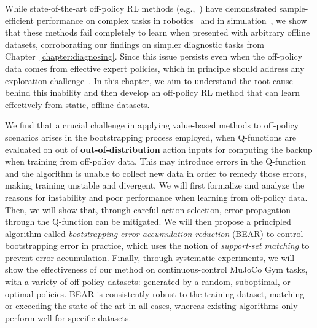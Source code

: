 While state-of-the-art off-policy RL methods (e.g.,~\citep{haarnoja2018sac,munos2016safe,kalashnikov2018qt,impala2018}) have demonstrated sample-efficient performance on complex tasks in robotics~\cite{kalashnikov2018qt} and in simulation~\cite{mujoco}, we show that these methods fail completely to learn when presented with arbitrary offline datasets, corroborating our findings on simpler diagnostic tasks from Chapter~\ref{chapter:diagnosing}. Since this issue persists even when the off-policy data comes from effective expert policies, which in principle should address any exploration challenge~\citep{deBruin2015importance,fujimoto2018off,fu2019diagnosing}. In this chapter, we aim to understand the root cause behind this inability and then develop an off-policy RL method that can learn effectively from static, offline datasets. 

We find that a crucial challenge in applying value-based methods to off-policy scenarios arises in the bootstrapping process employed, when Q-functions are evaluated on out of \textbf{out-of-distribution} action inputs for computing the backup when training from off-policy data. This may introduce errors in the Q-function and the algorithm is unable to collect new data in order to remedy those errors, making training unstable and divergent. We will first formalize and analyze the reasons for instability and poor performance when learning from off-policy data. Then, we will show that, through careful action selection, error propagation through the Q-function can be mitigated. We will then propose a principled algorithm called \emph{bootstrapping error accumulation reduction} (BEAR) to control bootstrapping error in practice, which uses the notion of \emph{support-set matching} to prevent error accumulation. Finally, through systematic experiments, we will show the effectiveness of our method on continuous-control MuJoCo Gym tasks, with a variety of off-policy datasets: generated by a random, suboptimal, or optimal policies. BEAR is consistently robust to the training dataset, matching or exceeding the state-of-the-art in all cases, whereas existing algorithms only perform well for specific datasets.


